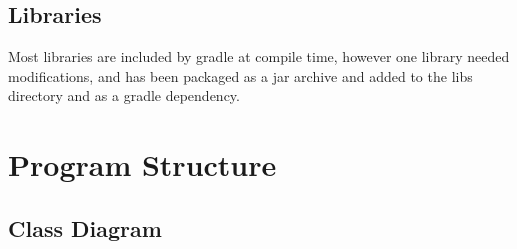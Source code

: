 \documentclass[11pt,english,numbers=endperiod,parskip=half]{scrartcl}
\begin{document}
  \subsection{Libraries}
  Most libraries are included by gradle at compile time, however one library
  needed modifications, and has been packaged as a jar archive and added
  to the libs directory and as a gradle dependency.
\section{Program Structure}
\newpage
  \subsection{Class Diagram}
    \begin{figure}[H]
    \end{figure}
\end{document}
